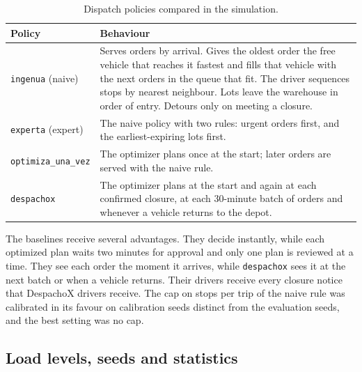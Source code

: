 \documentclass[11pt]{article}
\newcommand{\code}[1]{\texttt{\small #1}}
\begin{document}
\begin{table}[ht]
\centering
\small
\caption{Dispatch policies compared in the simulation.}
\label{tab:policies}
\begin{tabularx}{\linewidth}{L{3.3cm} Y}
\toprule
Policy & Behaviour \\
\midrule
\code{ingenua} (naive) & Serves orders by arrival. Gives the oldest order the free vehicle that reaches it fastest and fills that vehicle with the next orders in the queue that fit. The driver sequences stops by nearest neighbour. Lots leave the warehouse in order of entry. Detours only on meeting a closure. \\
\code{experta} (expert) & The naive policy with two rules: urgent orders first, and the earliest-expiring lots first. \\
\code{optimiza\_una\_vez} & The optimizer plans once at the start; later orders are served with the naive rule. \\
\code{despachox} & The optimizer plans at the start and again at each confirmed closure, at each 30-minute batch of orders and whenever a vehicle returns to the depot. \\
\bottomrule
\end{tabularx}
\end{table}

The baselines receive several advantages. They decide instantly, while each optimized plan waits two minutes for approval and only one plan is reviewed at a time. They see each order the moment it arrives, while \code{despachox} sees it at the next batch or when a vehicle returns. Their drivers receive every closure notice that DespachoX drivers receive. The cap on stops per trip of the naive rule was calibrated in its favour on calibration seeds distinct from the evaluation seeds, and the best setting was no cap. %

\subsection{Load levels, seeds and statistics}
\end{document}
